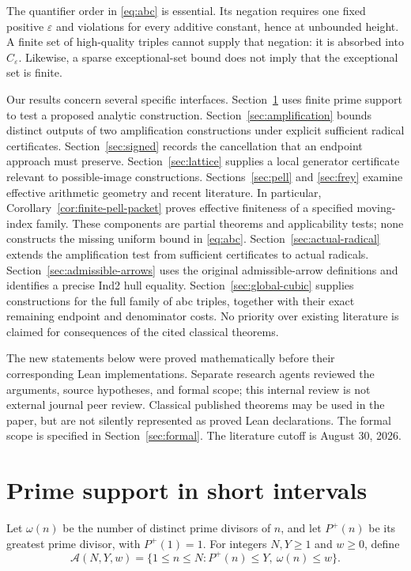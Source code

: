 \documentclass[11pt]{amsart}
\theoremstyle{definition}
\theoremstyle{remark}
\newcommand{\eps}{\varepsilon}
\begin{document}
The quantifier order in \eqref{eq:abc} is essential. Its negation requires
one fixed positive $\eps$ and violations for every additive constant, hence
at unbounded height. A finite set of high-quality triples cannot supply that
negation: it is absorbed into $C_\eps$. Likewise, a sparse exceptional-set
bound does not imply that the exceptional set is finite.

Our results concern several specific interfaces. Section~\ref{sec:smooth}
uses finite prime support to test a proposed analytic construction.
Section~\ref{sec:amplification} bounds distinct outputs of two amplification
constructions under explicit sufficient radical certificates.
Section~\ref{sec:signed} records the cancellation that an endpoint approach
must preserve. Section~\ref{sec:lattice} supplies a local generator
certificate relevant to possible-image constructions. Sections~\ref{sec:pell}
and \ref{sec:frey} examine effective arithmetic geometry and recent
literature. In particular, Corollary~\ref{cor:finite-pell-packet} proves
effective finiteness of a specified moving-index family. These components
are partial theorems and applicability tests; none
constructs the missing uniform bound in \eqref{eq:abc}.
Section~\ref{sec:actual-radical} extends the amplification test from
sufficient certificates to actual radicals. Section~\ref{sec:admissible-arrows}
uses the original admissible-arrow definitions and identifies a precise
Ind2 hull equality. Section~\ref{sec:global-cubic} supplies constructions
for the full family of abc triples, together with their exact remaining
endpoint and denominator costs. No priority over existing literature is
claimed for consequences of the cited classical theorems.

The new statements below were proved mathematically before their
corresponding Lean implementations. Separate research agents reviewed the
arguments, source hypotheses, and formal scope; this internal review is
not external journal peer review. Classical published
theorems may be used in the paper, but are not silently represented as
proved Lean declarations. The formal scope is specified in
Section~\ref{sec:formal}. The literature cutoff is August 30, 2026.

\section{Prime support in short intervals}\label{sec:smooth}

Let $\omega(n)$ be the number of distinct prime divisors of $n$, and let
$P^+(n)$ be its greatest prime divisor, with $P^+(1)=1$.
For integers $N,Y\ge1$ and $w\ge0$, define
\[
 \mathcal A(N,Y,w)=
 \{1\le n\le N:P^+(n)\le Y,\ \omega(n)\le w\}.
\]
\end{document}
